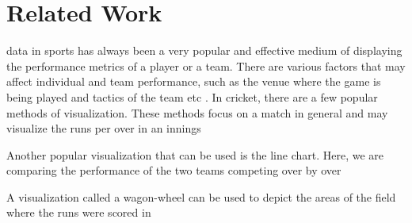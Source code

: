 \documentclass[10pt,journal,compsoc]{IEEEtran}
\begin{document}
\section{Related Work}
 data in sports has always been a very popular and effective medium of displaying the performance metrics of a player or a team. There are various factors that may affect individual and team performance, such as the venue where the game is being played and tactics of the team etc \cite{paper2}. In cricket, there are a few popular methods of visualization. These methods focus on a match in general and may visualize the runs per over in an innings \cite{relatedwork1}

\begin{figure}[H]
\begin{center}
\end{center}
\end{figure}

Another popular visualization that can be used is the line chart. Here, we are comparing the performance of the two teams competing over by over\cite{relatedwork2}

\begin{figure}[H]
\begin{center}
\end{center}
\end{figure}

A visualization called a wagon-wheel can be used to depict the areas of the field where the runs were scored in\cite{relatedwork2}
\end{document}
